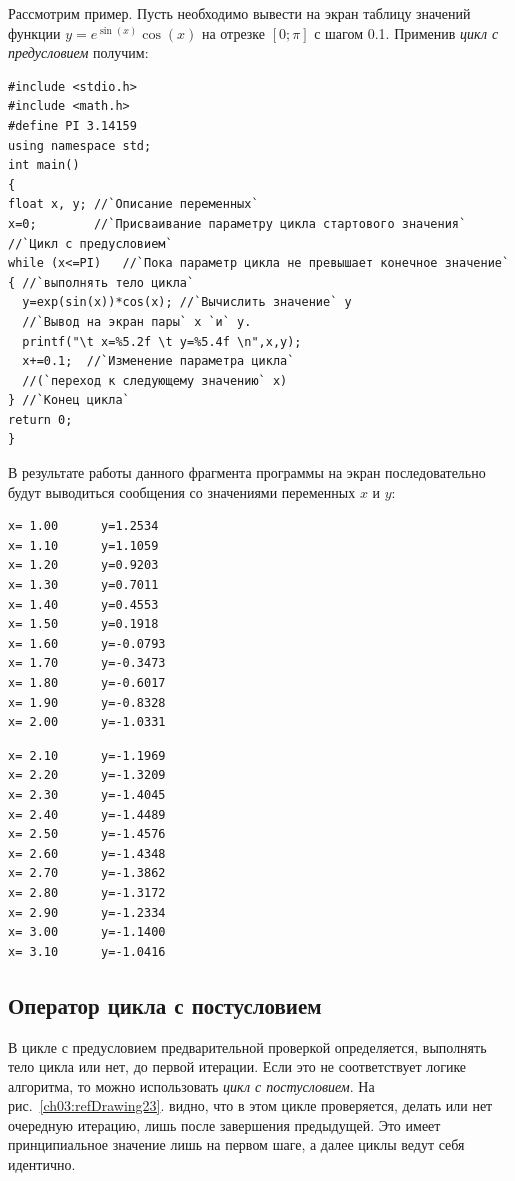 Рассмотрим пример. Пусть необходимо вывести на экран таблицу значений функции  $y=e^{\sin (x)}\cos (x)$ на отрезке 
$[0;\pi]$ с шагом 0.1. Применив \emph{цикл с предусловием} получим:
\begin{lstlisting}
#include <stdio.h>
#include <math.h>
#define PI 3.14159
using namespace std;
int main()
{
float x, y; //`Описание переменных`
x=0;        //`Присваивание параметру цикла стартового значения`
//`Цикл с предусловием`
while (x<=PI)	//`Пока параметр цикла не превышает конечное значение`
{ //`выполнять тело цикла`
  y=exp(sin(x))*cos(x); //`Вычислить значение` y
  //`Вывод на экран пары` x `и` y.
  printf("\t x=%5.2f \t y=%5.4f \n",x,y);
  x+=0.1;  //`Изменение параметра цикла` 
  //(`переход к следующему значению` x)
} //`Конец цикла`
return 0;
}
\end{lstlisting}

В результате работы данного фрагмента программы на экран последовательно будут выводиться сообщения со значениями
переменных $x$ и $y$\label{ch03:out0}:%

\smallskip
\noindent%
\begin{minipage}{.3\textwidth}
\begin{verbatim}
x= 1.00      y=1.2534 
x= 1.10      y=1.1059 
x= 1.20      y=0.9203 
x= 1.30      y=0.7011 
x= 1.40      y=0.4553 
x= 1.50      y=0.1918 
x= 1.60      y=-0.0793 
x= 1.70      y=-0.3473 
x= 1.80      y=-0.6017 
x= 1.90      y=-0.8328 
x= 2.00      y=-1.0331
\end{verbatim}
\end{minipage}
\begin{minipage}{.3\textwidth}
\begin{verbatim}
x= 2.10      y=-1.1969 
x= 2.20      y=-1.3209 
x= 2.30      y=-1.4045 
x= 2.40      y=-1.4489 
x= 2.50      y=-1.4576 
x= 2.60      y=-1.4348 
x= 2.70      y=-1.3862 
x= 2.80      y=-1.3172 
x= 2.90      y=-1.2334 
x= 3.00      y=-1.1400 
x= 3.10      y=-1.0416 
\end{verbatim}
\end{minipage}
\hfill

\subsection[Оператор цикла с постусловием]{Оператор цикла с постусловием}
В цикле с предусловием предварительной проверкой определяется, выполнять тело цикла или нет, до первой итерации. Если
это не соответствует логике алгоритма, то можно использовать 
\emph{цикл с постусловием}. На рис.~\ref{ch03:refDrawing23}.
видно, что в этом цикле проверяется, делать или нет очередную итерацию, лишь после завершения предыдущей. Это имеет
принципиальное значение лишь на первом шаге, а далее циклы ведут себя идентично. 

